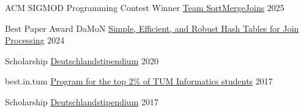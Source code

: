 
\begin{cvhonors}
  \cvhonor
  {ACM SIGMOD Programming Contest Winner} %
  {\href{https://sigmod-contest-2025.github.io/index.html}{Team SortMergeJoins}} %
  {} %
  {2025} %

  \cvhonor
  {Best Paper Award DaMoN} %
  {\href{https://damon-db.org/}{Simple, Efficient, and Robust Hash Tables for Join Processing}} %
  {} %
  {2024} %

  \cvhonor
  {Scholarship} %
  {\href{https://www.deutschlandstipendium.de/index.html}{Deutschlandstipendium}} %
  {} %
  {2020} %

  \cvhonor
  {best.in.tum} %
  {\href{https://www.cit.tum.de/en/cit/studies/students/advising/informatics/tips-for-successful-studies/support-programs/}{Program for the top 2\% of TUM Informatics students}} %
  {} %
  {2017} %

  \cvhonor
  {Scholarship} %
  {\href{https://www.deutschlandstipendium.de/index.html}{Deutschlandstipendium}} %
  {} %
  {2017} %
\end{cvhonors}

